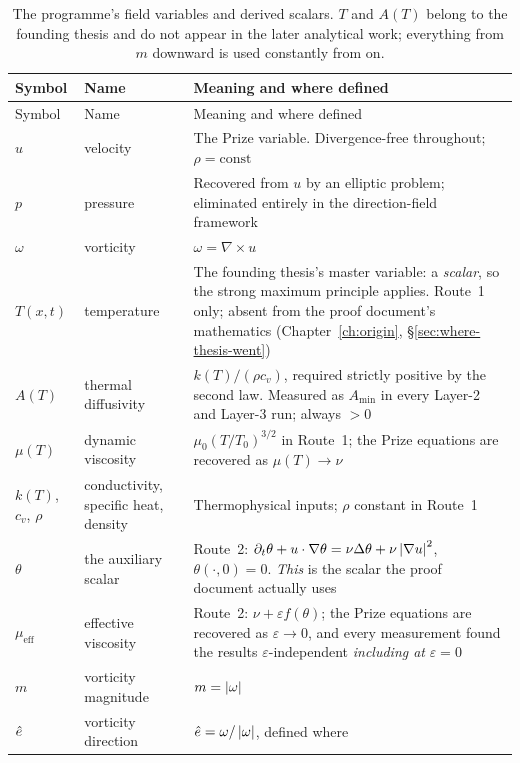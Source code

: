{\footnotesize
\begin{longtable}{@{}l p{} p{}@{}}
\caption[Fields and scalars]{The programme's field variables and derived
scalars. \(T\) and \(A(T)\) belong to the founding thesis and do not appear in
the later analytical work; everything from \(m\) downward is used constantly
from  on.}
\label{tab:a3-fields}\\
\toprule
Symbol & Name & Meaning and where defined \\
\midrule
\endfirsthead
\toprule
Symbol & Name & Meaning and where defined \\
\midrule
\endhead
\bottomrule
\endfoot
\(u\) & velocity & The Prize variable. Divergence-free throughout;
  \(\rho=\mathrm{const}\) \\
\(p\) & pressure & Recovered from \(u\) by an elliptic problem; eliminated
  entirely in the direction-field framework \\
\(\omega\) & vorticity & \(\omega=\nabla\times u\) \\
\(T(x,t)\) & temperature & The founding thesis's master variable: a
  \emph{scalar}, so the strong maximum principle applies. Route~1 only;
  absent from the proof document's mathematics
  (Chapter~\ref{ch:origin}, \S\ref{sec:where-thesis-went}) \\
\(A(T)\) & thermal diffusivity & \(k(T)/(\rho c_v)\), required strictly
  positive by the second law. Measured as \(A_{\min}\) in every Layer-2 and
  Layer-3 run; always \(>0\) \\
\(\mu(T)\) & dynamic viscosity & \(\mu_0(T/T_0)^{3/2}\) in Route~1; the
  Prize equations are recovered as \(\mu(T)\to\nu\) \\
\(k(T)\), \(c_v\), \(\rho\) & conductivity, specific heat, density
  & Thermophysical inputs; \(\rho\) constant in Route~1 \\
\(\theta\) & the auxiliary scalar & Route~2:
  \(\partial_t\theta+u\cdot\nabla\theta=\nu\Delta\theta+\nu\left|\nabla u\right|^2\),
  \(\theta(\cdot,0)=0\). \emph{This} is the scalar the proof document actually
  uses \\
\(\mu_{\mathrm{eff}}\) & effective viscosity & Route~2:
  \(\nu+\varepsilon f(\theta)\); the Prize equations are recovered as
  \(\varepsilon\to0\), and every measurement found the results
  \(\varepsilon\)-independent \emph{including at} \(\varepsilon=0\) \\
\(m\) & vorticity magnitude & \(m=\left|\omega\right|\) \\
\(\hat{e}\) & vorticity direction & \(\hat{e}=\omega/\left|\omega\right|\), defined where

\end{longtable}}

